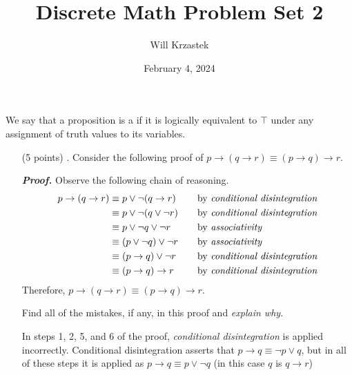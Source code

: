 \documentclass[11pt,a4paper]{article}
\begin{document}
\title{Discrete Math Problem Set 2}
\author{Will Krzastek}
\date{February 4, 2024}
\maketitle
We say that a proposition is a \emph{\color{red}{tautology}} if it is logically equivalent to $\top$ under any assignment of truth values to its variables.
\begin{enumerate}
    \item[(5 points) \quad 1.]
    Consider the following proof of $p \rightarrow (q \rightarrow r) \equiv (p \rightarrow q) \rightarrow r$.
    
    \emph{\textbf{Proof.}} Observe the following chain of reasoning.
    \begin{align*}
    p \rightarrow (q \rightarrow r) 
        &\equiv p \lor \neg(q \rightarrow r)   
            &\quad 
            &\text{by \emph{conditional disintegration}} \\ 
        &\equiv p \lor \neg(q \lor \neg r)
            &\quad
            &\text{by \emph{conditional disintegration}} \\
        &\equiv p \lor \neg q \lor \neg r
            &\quad
            &\text{by \emph{associativity}} \\
        &\equiv (p \lor \neg q) \lor \neg r
            &\quad
            &\text{by \emph{associativity}} \\
        &\equiv (p \rightarrow q) \lor \neg r
            &\quad
            &\text{by \emph{conditional disintegration}} \\
        &\equiv (p \rightarrow q) \rightarrow r
            &\quad
            &\text{by \emph{conditional disintegration}}
    \end{align*}
    Therefore, $p \rightarrow (q \rightarrow r) \equiv (p \rightarrow q) \rightarrow r$.

    Find all of the mistakes, if any, in this proof and \emph{explain why}.

    In steps 1, 2, 5, and 6 of the proof, \emph{conditional disintegration} is applied incorrectly. Conditional disintegration asserts that $p \rightarrow q \equiv \neg p \lor q$, but in all of these steps it is applied as $p \rightarrow q \equiv p \lor \neg q$ (in this case $q$ is $q \rightarrow r$)


\end{enumerate}
\end{document}
